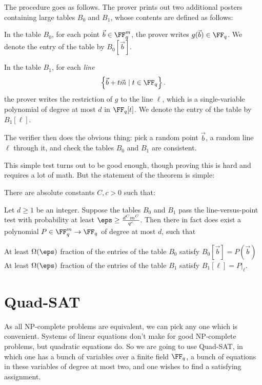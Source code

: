 \documentclass[11pt]{scrreprt}
\begin{document}
The procedure goes as follows.
The prover prints out two additional posters containing large tables $B_0$ and $B_1$,
whose contents are defined as follows:
\begin{itemize}
  \ii In the table $B_0$, for each point $\vec b \in \FF_q^m$,
  the prover writes $g(\vec b) \in \FF_q$.
  We denote the entry of the table by $B_0[\vec b]$.

  \ii In the table $B_1$, for each \emph{line}
  \[ \left\{ \vec b + t \vec m \mid t \in \FF_q \right\}. \]
  the prover writes the restriction of $g$ to the line $\ell$,
  which is a single-variable polynomial of degree at most $d$ in $\FF_q[t]$.
  We denote the entry of the table by $B_1[\ell]$.
\end{itemize}
The verifier then does the obvious thing:
pick a random point $\vec b$, a random line $\ell$ through it,
and check the tables $B_0$ and $B_1$ are consistent.

This simple test turns out to be good enough, though proving this is hard
and requires a lot of math.
But the statement of the theorem is simple:
\begin{theorem}
  There are absolute constants $C, c > 0$ such that:

  Let $d \ge 1$ be an integer.
  Suppose the tables $B_0$ and $B_1$ pass the line-versus-point test
  with probability at least $\eps \ge \frac{d^C m^C}{q^c}$.
  Then there in fact does exist a polynomial $P \in \FF_q^m \to \FF_q$
  of degree at most $d$, such that
  \begin{itemize}
    \ii At least $\Omega(\eps)$ fraction of the entries of the table $B_0$
    satisfy $B_0[\vec b] = P(\vec b)$
    \ii At least $\Omega(\eps)$ fraction of the entries of the table $B_1$
    satisfy $B_1[\ell] = P|_\ell$.
  \end{itemize}
\end{theorem}

\section{Quad-SAT}
As all NP-complete problems are equivalent, we can pick any one which is convenient.
Systems of linear equations don't make for good NP-complete problems,
but quadratic equations do.
So we are going to use Quad-SAT,
in which one has a bunch of variables over a finite field $\FF_q$,
a bunch of equations in these variables of degree at most two,
and one wishes to find a satisfying assignment.
\end{document}
